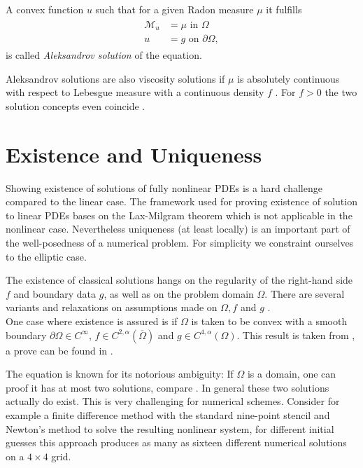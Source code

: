 \begin{definition}\label{def:aleksandrov solution}
A convex function $u$ such that for a given Radon measure $\mu$ it fulfills
\begin{align}
\begin{split}
\mathcal M_u&= \mu \text{ in } \Omega\\ 
u &= g  \text{ on } \partial \Omega,
\end{split}
\end{align}
is called \emph{Aleksandrov solution} of the \MA equation.
\end{definition}

Aleksandrov solutions are also viscosity solutions if $\mu$ is absolutely continuous with respect to Lebesgue measure with a continuous density $f$ \cite[proposition 1.3.4.]{Gutierrez2001} . For $f > 0$ the two solution concepts even coincide \cite[proposition 1.7.1]{Gutierrez2001}. 

\section{Existence and Uniqueness} \label{sec: Existence and Uniqueness}
Showing existence of solutions of fully nonlinear PDEs is a hard challenge compared to the linear case. The framework used for proving existence of solution to linear PDEs bases on the Lax-Milgram theorem which is not applicable in the nonlinear case. Nevertheless uniqueness (at least locally) is an important part of the well-posedness of a numerical problem. 
For simplicity we constraint ourselves to the elliptic case. 

The existence of classical solutions hangs on the regularity of the right-hand side $f$ and boundary data $g$, as well as on the problem domain $\Omega$. There are several variants and relaxations on assumptions made on $\Omega,f$ and $g$ \cite{Gutierrez2001, GT1983, Urbas1998}. \\
One case where existence is assured is if $\Omega$ is taken to be convex with a smooth boundary $\partial \Omega \in C^\infty$, $f \in C^{2,\alpha}(\overline \Omega)$ and $g \in C^{4,\alpha}(\Omega)$. This result is taken from \cite[p.357]{Neilan2014}, a prove can be found in \cite{Gutierrez2001}.

The \MA equation is known for its notorious ambiguity: If $\Omega$ is a domain, one can proof it has at most two solutions, compare \cite[Kap.IV, \S 5,3]{CH1968}. In general these two solutions actually do exist.
This is very challenging for numerical schemes. Consider for example a finite difference method with the standard nine-point stencil and Newton's method to solve the resulting nonlinear system, for different initial guesses this approach produces as many as sixteen different numerical solutions on a $4 \times 4$ grid\cite{FGN2013}. 

